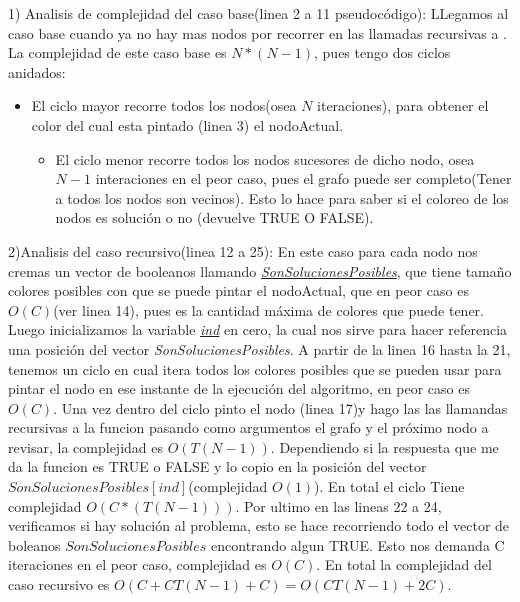 1) Analisis de complejidad del caso base(linea 2 a 11 pseudocódigo): LLegamos al caso base cuando ya no hay mas nodos por recorrer en las llamadas recursivas a . La complejidad de este caso base es $N*(N-1)$, pues tengo dos ciclos anidados: 
\begin{itemize}
	\item El ciclo mayor recorre todos los nodos(osea $N$ iteraciones), para obtener el color del cual esta pintado (linea 3) el nodoActual.
	\begin{itemize}
		\item El ciclo menor  recorre todos los nodos sucesores de dicho nodo, osea $N-1$ interaciones en el peor caso, pues el grafo puede ser completo(Tener a todos los nodos son vecinos). Esto lo hace para saber si el coloreo de los nodos es solución o no (devuelve TRUE O FALSE). 
	\end{itemize}  
\end{itemize}

2)Analisis del caso recursivo(linea 12 a 25): En este caso para cada nodo nos cremas un vector de booleanos llamando \underline{\textsl{SonSolucionesPosibles}}, que tiene tamaño colores posibles con que se puede pintar el nodoActual, que en peor caso es $O(C)$(ver linea 14), pues es la cantidad máxima de colores que puede tener. Luego inicializamos la variable \underline{\textit{ind}} en cero, la cual nos sirve para hacer referencia una posición del  vector \textsl{SonSolucionesPosibles}. \newline
A partir de la linea 16  hasta la 21, tenemos un ciclo en cual itera todos los colores posibles que se pueden usar para pintar el nodo en ese instante de la ejecución del algoritmo, en peor caso es $O(C)$. Una vez dentro del ciclo pinto el nodo (linea 17)y hago las las llamandas recursivas a la funcion  pasando como argumentos el grafo y el próximo nodo a revisar, la complejidad es $O(T(N-1))$. Dependiendo si la respuesta que me da la funcion  es TRUE o FALSE y lo copio en la posición del vector $SonSolucionesPosibles[ind]$(complejidad $O(1)$).
En total el ciclo Tiene complejidad $O(C*(T(N-1)))$. \newline
Por ultimo en las lineas 22 a 24, verificamos si hay solución al problema, esto se hace recorriendo todo el vector  de boleanos    $SonSolucionesPosibles$ encontrando algun TRUE. Esto nos demanda C iteraciones en el peor caso, complejidad es $O(C)$.\newline
En total la complejidad del caso recursivo es $O(C+CT(N-1)+C)=O(CT(N-1)+2C)$. \newline


